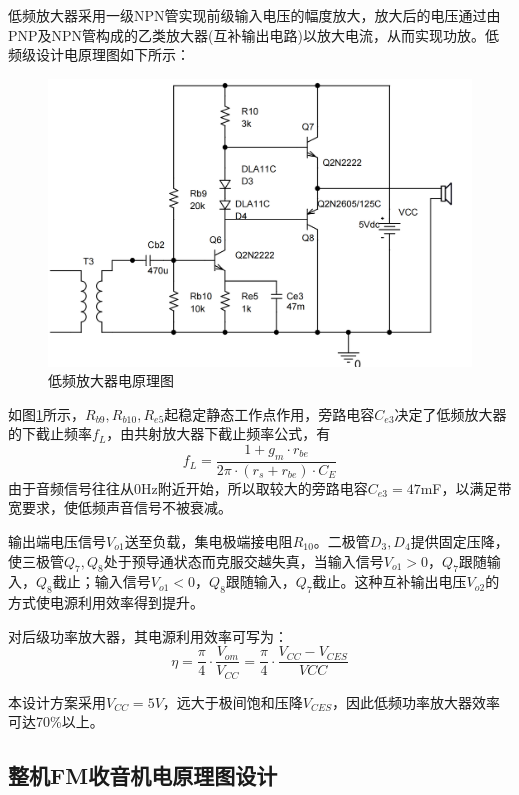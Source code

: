 \documentclass[a4paper,12pt,twoside]{article}
\begin{document}
低频放大器采用一级NPN管实现前级输入电压的幅度放大，放大后的电压通过由PNP及NPN管构成的乙类放大器(互补输出电路)以放大电流，从而实现功放\cite{谢}。低频级设计电原理图如下所示：
\begin{figure}[H]
    \centering
    \includegraphics[scale=0.14]{低放sch.png}
    \caption{低频放大器电原理图}
    \label{低放原理图}
\end{figure}

如图\ref{低放原理图}所示，$R_{b9},R_{b10},R_{e5}$起稳定静态工作点作用，旁路电容$C_{e3}$决定了低频放大器的下截止频率$f_L$，由共射放大器下截止频率公式，有
\begin{equation}
    f_{L}=\frac{1+g_m\cdot r_{be}}{2\pi \cdot (r_s+r_{be})\cdot C_E}
    \label{式22}
\end{equation}
由于音频信号往往从0Hz附近开始，所以取较大的旁路电容$C_{e3}=47$mF，以满足带宽要求，使低频声音信号不被衰减。


输出端电压信号$V_{o1}$送至负载，集电极端接电阻$R_{10}$。二极管$D_3,D_4$提供固定压降，使三极管$Q_7,Q_8$处于预导通状态而克服交越失真，当输入信号$V_{o1}>0$，$Q_7$跟随输入，$Q_8$截止；输入信号$V_{o1}<0$，$Q_8$跟随输入，$Q_7$截止。这种互补输出电压$V_{o2}$的方式使电源利用效率得到提升。

对后级功率放大器，其电源利用效率可写为：
\begin{equation}
    \eta = \frac{\pi}{4}\cdot \frac{V_{om}}{V_{CC}}=\frac{\pi}{4}\cdot \frac{V_{CC}-V_{CES}}{VCC}
    \label{效率}
\end{equation}

本设计方案采用$V_{CC}=5V$，远大于极间饱和压降$V_{CES}$，因此低频功率放大器效率可达70\%以上。

\subsection{整机FM收音机电原理图设计}
\end{document}
